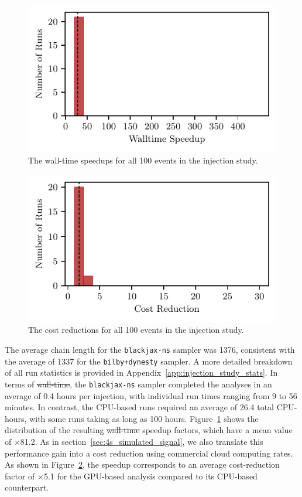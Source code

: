 \documentclass[fleqn,usenatbib]{mnras}
\providecommand{\DIFadd}[1]{{\protect\color{blue}\uwave{#1}}} %
\providecommand{\DIFdel}[1]{{\protect\color{red}\sout{#1}}}                      %
\providecommand{\DIFaddbegin}{} %
\providecommand{\DIFaddend}{} %
\providecommand{\DIFdelbegin}{} %
\providecommand{\DIFdelend}{} %
\newcommand{\DIFscaledelfig}{0.5}
\newlength{\DIFdelgraphicswidth} %
\newlength{\DIFdelgraphicsheight} %
\newcommand{\DIFaddincludegraphics}[2][]{{\color{blue}\fbox{\DIFOincludegraphics[#1]{#2}}}} %
\newcommand{\DIFdelincludegraphics}[2][]{%
\sbox{\DIFdelgraphicsbox}{\DIFOincludegraphics[#1]{#2}}%
\settoboxwidth{\DIFdelgraphicswidth}{\DIFdelgraphicsbox} %
\settoboxtotalheight{\DIFdelgraphicsheight}{\DIFdelgraphicsbox} %
\scalebox{\DIFscaledelfig}{%
\parbox[b]{\DIFdelgraphicswidth}{\usebox{\DIFdelgraphicsbox}\\[-\baselineskip] \rule{\DIFdelgraphicswidth}{0em}}\llap{\resizebox{\DIFdelgraphicswidth}{\DIFdelgraphicsheight}{%
\setlength{\unitlength}{\DIFdelgraphicswidth}%
\begin{picture}(1,1)%
\thicklines\linethickness{2pt} %
{\color[rgb]{1,0,0}\put(0,0){\framebox(1,1){}}}%
{\color[rgb]{1,0,0}\put(0,0){\line( 1,1){1}}}%
{\color[rgb]{1,0,0}\put(0,1){\line(1,-1){1}}}%
\end{picture}%
}\hspace*{3pt}}} %
} %
\DeclareRobustCommand{\DIFaddbegin}{\DIFOaddbegin \let\includegraphics\DIFaddincludegraphics} %
\DeclareRobustCommand{\DIFaddend}{\DIFOaddend \let\includegraphics\DIFOincludegraphics} %
\DeclareRobustCommand{\DIFdelbegin}{\DIFOdelbegin \let\includegraphics\DIFdelincludegraphics} %
\DeclareRobustCommand{\DIFdelend}{\DIFOaddend \let\includegraphics\DIFOincludegraphics} %
\begin{document}
\begin{figure}
    \centering
    \includegraphics{figures/walltime_speedup.pdf}
    \caption{The wall-time speedups for all 100 events in the injection study.}
    \label{fig:speedup_comparison}
\end{figure}

\begin{figure}
    \centering
    \includegraphics{figures/cost_reduction.pdf}
    \caption{The cost reductions for all 100 events in the injection study.}
    \label{fig:cost_reduction}
\end{figure}

The average chain length for the \texttt{blackjax-ns}
sampler was 1376, consistent with the average of 1337 for the
\texttt{bilby+dynesty} sampler. A more detailed breakdown of all run
statistics is provided in Appendix~\ref{app:injection_study_stats}.
In terms of \DIFdelbegin \DIFdel{wall-time}\DIFdelend \DIFaddbegin \DIFadd{runtime}\DIFaddend , the \texttt{blackjax-ns} sampler completed the analyses
in an average of 0.4 hours per injection, with individual run
times ranging from 9 to 56 minutes.
In contrast, the CPU-based runs
required an average of 26.4 total CPU-hours, with some runs taking as long as 
100 hours. 
Figure~\ref{fig:speedup_comparison} shows the distribution of the
resulting \DIFdelbegin \DIFdel{wall-time }\DIFdelend \DIFaddbegin \DIFadd{runtime }\DIFaddend speedup factors, which have a mean value of
$\times$81.2. As in 
section~\ref{sec:4s_simulated_signal}, we also translate this performance 
gain into a cost reduction using commercial cloud computing rates.
As shown in Figure~\ref{fig:cost_reduction}, the speedup
corresponds to an average cost-reduction factor of $\times$5.1 for the
GPU-based analysis compared to its CPU-based counterpart.
\end{document}
